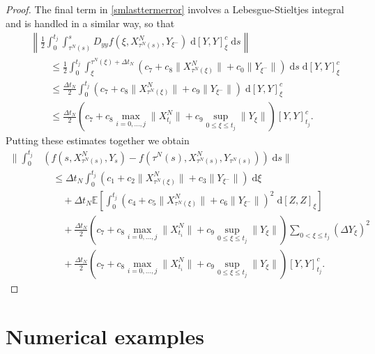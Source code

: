 \documentclass[reqno,12pt]{amsart}
\theoremstyle{plain} %
\theoremstyle{definition} %
\begin{document}
\begin{proof}
    The final term in \eqref{smlasttermerror} involves a Lebesgue-Stieltjes integral and is handled in a similar way, so that
    \begin{align*}
        & \left\|\frac{1}{2} \int_0^{t_j} \int_{\tau^N(s)}^s D_{yy}f(\xi, X_{\tau^N(s)}^N, Y_{\xi^-})\;\mathrm{d}[Y, Y]_\xi^c\;\mathrm{d}s \right\| \\
        & \qquad \leq \frac{1}{2} \int_0^{t_j} \int_{\xi}^{\tau^N(\xi) + \Delta t_N} \left(c_7 + c_8 \|X_{\tau^N(\xi)}^N\| + c_0\|Y_{\xi^-}\|\right)\;\mathrm{d}s\;\mathrm{d}[Y, Y]_\xi^c \\
        & \qquad \leq \frac{\Delta t_N}{2}\int_0^{t_j} \left(c_7 + c_8 \|X_{\tau^N(\xi)}^N\| + c_9\|Y_{\xi^-}\|\right)\;\mathrm{d}[Y, Y]_\xi^c \\ 
        & \qquad \leq \frac{\Delta t_N}{2} \left(c_7 + c_8 \max_{i=0, \ldots, j}\|X_{t_i}^N\| + c_9\sup_{0\leq \xi \leq t_j}\|Y_\xi\|\right) [Y, Y]_{t_j}^c.
    \end{align*}
    Putting these estimates together we obtain
    \begin{equation}
        \begin{aligned}
            \bigg\|\int_0^{t_j} & \left( f(s, X_{\tau^N(s)}^N, Y_s) - f(\tau^N(s), X_{\tau^N(s)}^N, Y_{\tau^N(s)}) \right)\;\mathrm{d}s \bigg\| \\
            & \quad \leq \Delta t_N\int_0^{t_j} \left(c_1 + c_2 \|X_{\tau^N(\xi)}^N\| + c_3\|Y_{\xi^-}\|\right)\;\mathrm{d}\xi \\
            & \qquad + \Delta t_N\mathbb{E}\left[\int_0^{t_j} \left(c_4 + c_5\|X_{\tau^N(\xi)}^N\| + c_6 \|Y_{\xi^-}\| \right)^2\;\mathrm{d}[Z, Z]_\xi\right] \\
            & \qquad + \frac{\Delta t_N}{2} \left( c_7 + c_8 \max_{i=0, \ldots, j}\|X_{t_i}^N\| + c_9 \sup_{0\leq \xi \leq t_j}\|Y_\xi\|\right) \sum_{0 < \xi \leq t_j}\left( \Delta Y_\xi \right)^2 \\
            & \qquad + \frac{\Delta t_N}{2} \left(c_7 + c_8 \max_{i=0, \ldots, j}\|X_{t_i}^N\| + c_9\sup_{0\leq \xi \leq t_j}\|Y_\xi\|\right) [Y, Y]_{t_j}^c.
        \end{aligned}
    \end{equation}
\end{proof}

\section{Numerical examples}
\label{secnumericalexamples}
\end{document}
